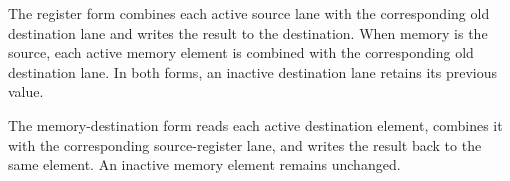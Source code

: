 The register form combines each active source lane with the corresponding old
destination lane and writes the result to the destination. When memory is the
source, each active memory element is combined with the corresponding old
destination lane. In both forms, an inactive destination lane retains its
previous value.

The memory-destination form reads each active destination element, combines it
with the corresponding source-register lane, and writes the result back to the
same element. An inactive memory element remains unchanged.
